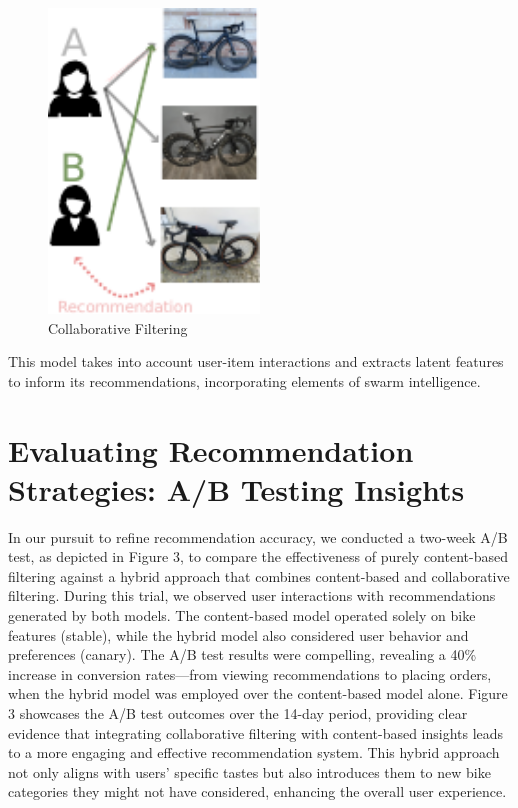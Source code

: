 \documentclass{article}
\begin{document}
\begin{figure}[h]
\centering
\includegraphics[width=0.5\textwidth]{collaborative.pdf}
\caption{Collaborative Filtering}
\end{figure}
This model takes into account user-item interactions and extracts latent features to inform its recommendations, incorporating elements of swarm intelligence.

\section*{Evaluating Recommendation Strategies: A/B Testing Insights}
In our pursuit to refine recommendation accuracy, we conducted a two-week A/B test, as depicted in Figure 3, to compare the effectiveness of purely content-based filtering against a hybrid approach that combines content-based and collaborative filtering.
During this trial, we observed user interactions with recommendations generated by both models. The content-based model operated solely on bike features (stable), while the hybrid model also considered user behavior and preferences (canary). The A/B test results were compelling, revealing a 40\% increase in conversion rates—from viewing recommendations to placing orders, when the hybrid model was employed over the content-based model alone.
Figure 3 showcases the A/B test outcomes over the 14-day period, providing clear evidence that integrating collaborative filtering with content-based insights leads to a more engaging and effective recommendation system. This hybrid approach not only aligns with users' specific tastes but also introduces them to new bike categories they might not have considered, enhancing the overall user experience.
\end{document}
